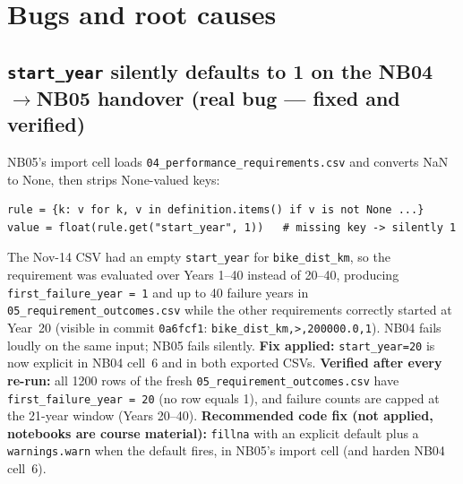 \documentclass[11pt,a4paper]{article}
\begin{document}
\section{Bugs and root causes}

\subsection{\texttt{start\_year} silently defaults to 1 on the NB04$\to$NB05 handover (real bug --- fixed and verified)}
NB05's import cell loads \texttt{04\_performance\_requirements.csv} and converts NaN to
None, then strips None-valued keys:
\begin{lstlisting}
rule = {k: v for k, v in definition.items() if v is not None ...}
value = float(rule.get("start_year", 1))   # missing key -> silently 1
\end{lstlisting}
The Nov-14 CSV had an empty \texttt{start\_year} for \texttt{bike\_dist\_km}, so the
requirement was evaluated over Years 1--40 instead of 20--40, producing
\texttt{first\_failure\_year = 1} and up to 40 failure years in
\texttt{05\_requirement\_outcomes.csv} while the other requirements correctly started
at Year~20 (visible in commit \texttt{0a6fcf1}: \texttt{bike\_dist\_km,>,200000.0,1}).
NB04 fails loudly on the same input; NB05 fails silently.
\textbf{Fix applied:} \texttt{start\_year=20} is now explicit in NB04 cell~6 and in both
exported CSVs. \textbf{Verified after every re-run:} all 1200 rows of the fresh
\texttt{05\_requirement\_outcomes.csv} have \texttt{first\_failure\_year = 20}
(no row equals 1), and failure counts are capped at the 21-year window
(Years 20--40). \textbf{Recommended code fix (not applied, notebooks are course material):}
\texttt{fillna} with an explicit default plus a \texttt{warnings.warn} when the default
fires, in NB05's import cell (and harden NB04 cell~6).
\end{document}

